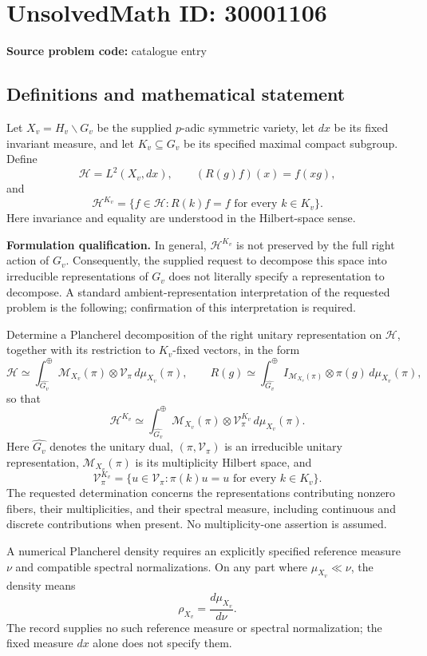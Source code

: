 \documentclass[11pt]{article}
\begin{document}
\section*{UnsolvedMath ID: 30001106}
\textbf{Source problem code:} catalogue entry
\subsection{Definitions and mathematical statement}
Let \(X_v=H_v\backslash G_v\) be the supplied \(p\)-adic symmetric variety, let \(dx\) be its fixed invariant measure, and let \(K_v\subseteq G_v\) be its specified maximal compact subgroup. Define
\[
\mathcal H=L^2(X_v,dx),\qquad (R(g)f)(x)=f(xg),
\]
and
\[
\mathcal H^{K_v}=\{f\in\mathcal H:R(k)f=f\text{ for every }k\in K_v\}.
\]
Here invariance and equality are understood in the Hilbert-space sense.

\textbf{Formulation qualification.} In general, \(\mathcal H^{K_v}\) is not preserved by the full right action of \(G_v\). Consequently, the supplied request to decompose this space into irreducible representations of \(G_v\) does not literally specify a representation to decompose. A standard ambient-representation interpretation of the requested problem is the following; confirmation of this interpretation is required.

Determine a Plancherel decomposition of the right unitary representation on \(\mathcal H\), together with its restriction to \(K_v\)-fixed vectors, in the form
\[
\mathcal H\simeq
\int_{\widehat{G_v}}^{\oplus}
\mathcal M_{X_v}(\pi)\otimes\mathcal V_\pi\,
 d\mu_{X_v}(\pi),
\qquad
R(g)\simeq\int_{\widehat{G_v}}^{\oplus}
I_{\mathcal M_{X_v}(\pi)}\otimes\pi(g)\,
 d\mu_{X_v}(\pi),
\]
so that
\[
\mathcal H^{K_v}\simeq
\int_{\widehat{G_v}}^{\oplus}
\mathcal M_{X_v}(\pi)\otimes\mathcal V_\pi^{K_v}\,
 d\mu_{X_v}(\pi).
\]
Here \(\widehat{G_v}\) denotes the unitary dual, \((\pi,\mathcal V_\pi)\) is an irreducible unitary representation, \(\mathcal M_{X_v}(\pi)\) is its multiplicity Hilbert space, and
\[
\mathcal V_\pi^{K_v}=\{u\in\mathcal V_\pi:\pi(k)u=u\text{ for every }k\in K_v\}.
\]
The requested determination concerns the representations contributing nonzero fibers, their multiplicities, and their spectral measure, including continuous and discrete contributions when present. No multiplicity-one assertion is assumed.

A numerical Plancherel density requires an explicitly specified reference measure \(\nu\) and compatible spectral normalizations. On any part where \(\mu_{X_v}\ll\nu\), the density means
\[
\rho_{X_v}=\frac{d\mu_{X_v}}{d\nu}.
\]
The record supplies no such reference measure or spectral normalization; the fixed measure \(dx\) alone does not specify them.
\end{document}
